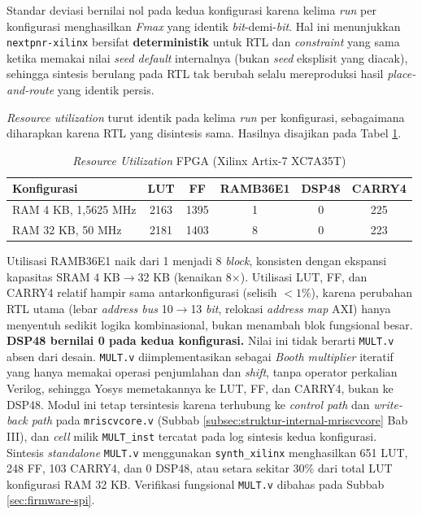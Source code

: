 Standar deviasi bernilai nol pada kedua konfigurasi karena kelima \textit{run} per konfigurasi menghasilkan \textit{Fmax} yang identik \textit{bit}-demi-\textit{bit}. Hal ini menunjukkan \texttt{nextpnr-xilinx} bersifat \textbf{deterministik} untuk RTL dan \textit{constraint} yang sama ketika memakai nilai \textit{seed default} internalnya (bukan \textit{seed} eksplisit yang diacak), sehingga sintesis berulang pada RTL tak berubah selalu mereproduksi hasil \textit{place-and-route} yang identik persis.

\textit{Resource utilization} turut identik pada kelima \textit{run} per konfigurasi, sebagaimana diharapkan karena RTL yang disintesis sama. Hasilnya disajikan pada Tabel \ref{Tab: Utilisasi Resource}.

\begin{table}[h]
	\centering
	\begin{tabular}{|l|c|c|c|c|c|}
		\hline
		\textbf{Konfigurasi} & \textbf{LUT} & \textbf{FF} & \textbf{RAMB36E1} & \textbf{DSP48} & \textbf{CARRY4} \\
		\hline
		RAM 4 KB, 1,5625 MHz & 2163 & 1395 & 1 & 0 & 225 \\ \hline
		RAM 32 KB, 50 MHz & 2181 & 1403 & 8 & 0 & 223 \\ \hline
	\end{tabular}
	\vspace{0.5em}
	\caption{\textit{Resource Utilization} FPGA (Xilinx Artix-7 XC7A35T)}
	\label{Tab: Utilisasi Resource}
\end{table}

Utilisasi RAMB36E1 naik dari 1 menjadi 8 \textit{block}, konsisten dengan ekspansi kapasitas SRAM 4 KB$\rightarrow$32 KB (kenaikan 8$\times$). Utilisasi LUT, FF, dan CARRY4 relatif hampir sama antarkonfigurasi (selisih $<1\%$), karena perubahan RTL utama (lebar \textit{address bus} 10$\rightarrow$13 \textit{bit}, relokasi \textit{address map} AXI) hanya menyentuh sedikit logika kombinasional, bukan menambah blok fungsional besar. \textbf{DSP48 bernilai 0 pada kedua konfigurasi.} Nilai ini tidak berarti \texttt{MULT.v} absen dari desain. \texttt{MULT.v} diimplementasikan sebagai \textit{Booth multiplier} iteratif yang hanya memakai operasi penjumlahan dan \textit{shift}, tanpa operator perkalian Verilog, sehingga Yosys memetakannya ke LUT, FF, dan CARRY4, bukan ke DSP48. Modul ini tetap tersintesis karena terhubung ke \textit{control path} dan \textit{write-back path} pada \texttt{mriscvcore.v} (Subbab \ref{subsec:struktur-internal-mriscvcore} Bab III), dan \textit{cell} milik \texttt{MULT\_inst} tercatat pada log sintesis kedua konfigurasi. Sintesis \textit{standalone} \texttt{MULT.v} menggunakan \texttt{synth\_xilinx} menghasilkan 651 LUT, 248 FF, 103 CARRY4, dan 0 DSP48, atau setara sekitar 30\% dari total LUT konfigurasi RAM 32 KB. Verifikasi fungsional \texttt{MULT.v} dibahas pada Subbab \ref{sec:firmware-spi}.

